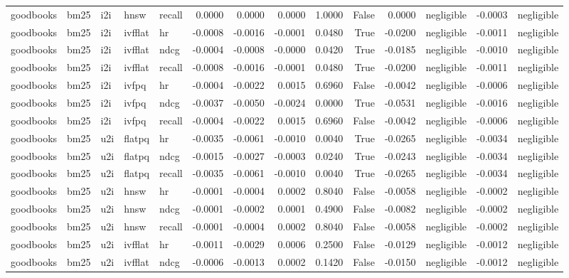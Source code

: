 \begin{tabular}{lllllrrrrrrlrl}
goodbooks & bm25 & i2i & hnsw & recall & 0.0000 & 0.0000 & 0.0000 & 1.0000 & False & 0.0000 & negligible & -0.0003 & negligible \\
goodbooks & bm25 & i2i & ivfflat & hr & -0.0008 & -0.0016 & -0.0001 & 0.0480 & True & -0.0200 & negligible & -0.0011 & negligible \\
goodbooks & bm25 & i2i & ivfflat & ndcg & -0.0004 & -0.0008 & -0.0000 & 0.0420 & True & -0.0185 & negligible & -0.0010 & negligible \\
goodbooks & bm25 & i2i & ivfflat & recall & -0.0008 & -0.0016 & -0.0001 & 0.0480 & True & -0.0200 & negligible & -0.0011 & negligible \\
goodbooks & bm25 & i2i & ivfpq & hr & -0.0004 & -0.0022 & 0.0015 & 0.6960 & False & -0.0042 & negligible & -0.0006 & negligible \\
goodbooks & bm25 & i2i & ivfpq & ndcg & -0.0037 & -0.0050 & -0.0024 & 0.0000 & True & -0.0531 & negligible & -0.0016 & negligible \\
goodbooks & bm25 & i2i & ivfpq & recall & -0.0004 & -0.0022 & 0.0015 & 0.6960 & False & -0.0042 & negligible & -0.0006 & negligible \\
goodbooks & bm25 & u2i & flatpq & hr & -0.0035 & -0.0061 & -0.0010 & 0.0040 & True & -0.0265 & negligible & -0.0034 & negligible \\
goodbooks & bm25 & u2i & flatpq & ndcg & -0.0015 & -0.0027 & -0.0003 & 0.0240 & True & -0.0243 & negligible & -0.0034 & negligible \\
goodbooks & bm25 & u2i & flatpq & recall & -0.0035 & -0.0061 & -0.0010 & 0.0040 & True & -0.0265 & negligible & -0.0034 & negligible \\
goodbooks & bm25 & u2i & hnsw & hr & -0.0001 & -0.0004 & 0.0002 & 0.8040 & False & -0.0058 & negligible & -0.0002 & negligible \\
goodbooks & bm25 & u2i & hnsw & ndcg & -0.0001 & -0.0002 & 0.0001 & 0.4900 & False & -0.0082 & negligible & -0.0002 & negligible \\
goodbooks & bm25 & u2i & hnsw & recall & -0.0001 & -0.0004 & 0.0002 & 0.8040 & False & -0.0058 & negligible & -0.0002 & negligible \\
goodbooks & bm25 & u2i & ivfflat & hr & -0.0011 & -0.0029 & 0.0006 & 0.2500 & False & -0.0129 & negligible & -0.0012 & negligible \\
goodbooks & bm25 & u2i & ivfflat & ndcg & -0.0006 & -0.0013 & 0.0002 & 0.1420 & False & -0.0150 & negligible & -0.0012 & negligible \\

\end{tabular}
